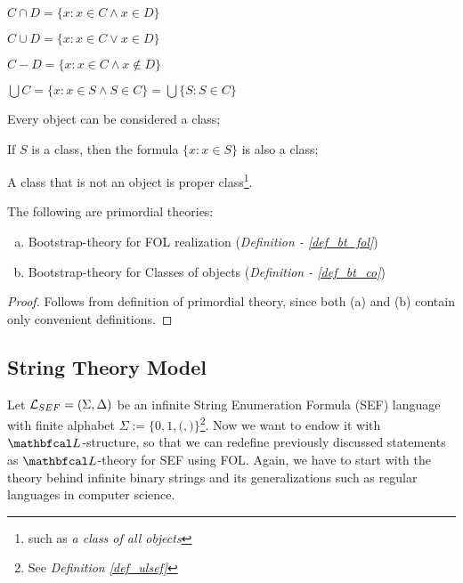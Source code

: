 \begin{definition}
\begin{legal}
    \begin{legal}
      \item $ C \cap D = \{x : x \in C \land x \in D\}$
      \item $ C \cup D = \{x : x \in C \lor  x \in D\}$
      \item $ C - D    = \{x : x \in C \land x \not\in D\}$
      \item $\bigcup C = \{x : x \in S \land S \in C\} = \bigcup\{ S: S \in C\}$
    \end{legal}
    \item Every object can be considered a class; 
    \item If $S$ is a class, then the formula $\{x : x \in S\}$ is also a class;
    \item A class that is not an object is proper class\footnote{such as \textit{a class of all objects}}.
  \end{legal}
\end{definition}









\begin{lemma}
  The following are primordial theories:
  \begin{enumerate}[(a)]
    \item Bootstrap-theory for FOL realization (\textit{Definition - \ref{def_bt_fol}})
    \item Bootstrap-theory for Classes of objects (\textit{Definition - \ref{def_bt_co}})
  \end{enumerate}
\end{lemma}
\begin{proof}
  Follows from definition of primordial theory, since both (a) and (b) contain only convenient definitions.
\end{proof}

\subsection{String Theory Model}

Let $\mathcal{L}_{SEF} = (\Sigma, \Delta)$ be an infinite String Enumeration Formula (SEF) language with finite alphabet $\Sigma := \{0,1,{(},{)}\}$\footnote{See \textit{Definition \ref{def_ulsef}}}. Now we want to endow it with $\lsign$-structure, so that we can redefine previously discussed statements as $\lsign$-theory\cite{marker2002model} for SEF using FOL. Again, we have to start with the theory behind infinite binary strings and its generalizations such as regular languages in computer science.

